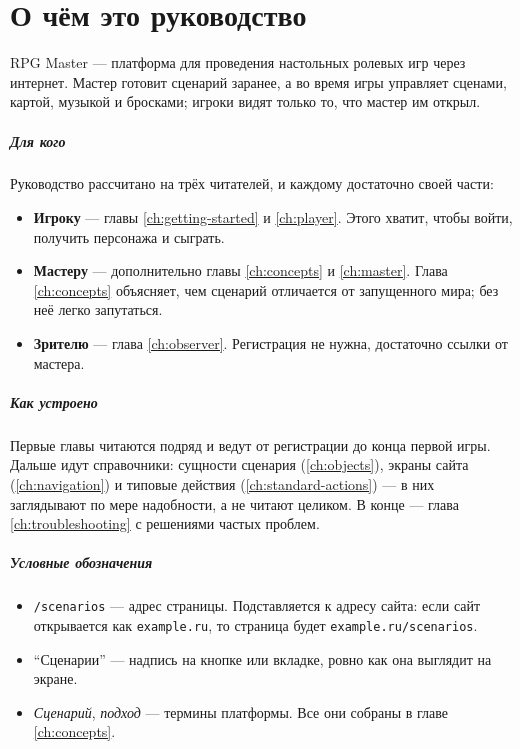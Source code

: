\chapter{О чём это руководство}
\label{ch:intro}

RPG Master --- платформа для проведения настольных ролевых игр через интернет. Мастер готовит сценарий заранее, а во время игры управляет сценами, картой, музыкой и бросками; игроки видят только то, что мастер им открыл.

\paragraph{Для кого}
Руководство рассчитано на трёх читателей, и каждому достаточно своей части:

\begin{itemize}
\item \textbf{Игроку} --- главы \ref{ch:getting-started} и \ref{ch:player}. Этого хватит, чтобы войти, получить персонажа и сыграть.
\item \textbf{Мастеру} --- дополнительно главы \ref{ch:concepts} и \ref{ch:master}. Глава \ref{ch:concepts} объясняет, чем сценарий отличается от запущенного мира; без неё легко запутаться.
\item \textbf{Зрителю} --- глава \ref{ch:observer}. Регистрация не нужна, достаточно ссылки от мастера.
\end{itemize}

\paragraph{Как устроено}
Первые главы читаются подряд и ведут от регистрации до конца первой игры. Дальше идут справочники: сущности сценария (\ref{ch:objects}), экраны сайта (\ref{ch:navigation}) и типовые действия (\ref{ch:standard-actions}) --- в них заглядывают по мере надобности, а не читают целиком. В конце --- глава \ref{ch:troubleshooting} с решениями частых проблем.

\paragraph{Условные обозначения}

\begin{itemize}
\item \texttt{/scenarios} --- адрес страницы. Подставляется к адресу сайта: если сайт открывается как \texttt{example.ru}, то страница будет \texttt{example.ru/scenarios}.
\item ``Сценарии'' --- надпись на кнопке или вкладке, ровно как она выглядит на экране.
\item \emph{Сценарий}, \emph{подход} --- термины платформы. Все они собраны в главе \ref{ch:concepts}.
\end{itemize}

